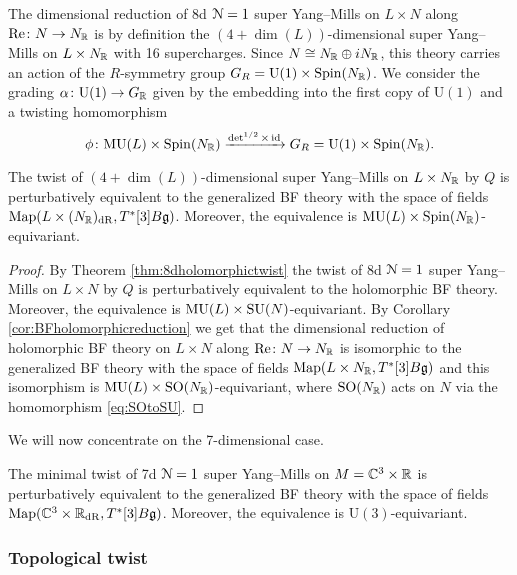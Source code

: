 \documentclass[10pt, oneside]{article}
\newcommand{\MU}{\mathrm{MU}}
\renewcommand{\Re}{\mathrm{Re}}
\renewcommand{\U}{\mathrm{U}}
\begin{document}
The dimensional reduction of 8d $\mathcal N=1$ super Yang--Mills on $L\times N$ along $\Re\colon N\rightarrow N_\RR$ is by definition the $(4+\dim(L))$-dimensional super Yang--Mills on $L\times N_\mathbb R$ with 16 supercharges. Since $N\cong N_\mathbb R\oplus iN_\mathbb R$, this theory carries an action of the $R$-symmetry group $G_R=\U(1)\times \Spin(N_\RR)$. We consider the grading $\alpha\colon \U(1)\rightarrow G_\RR$ given by the embedding into the first copy of $\U(1)$ and a twisting homomorphism
\[\phi\colon \MU(L)\times \Spin(N_\RR)\xrightarrow{\det^{1/2}\times \id} G_R=\U(1)\times \Spin(N_\RR).\]

\begin{theorem}
The twist of $(4+\dim(L))$-dimensional super Yang--Mills on $L\times N_\mathbb R$ by $Q$ is perturbatively equivalent to the generalized BF theory with the space of fields $\operatorname{Map}(L\times (N_\mathbb R)_{\mathrm{dR}}, T^*[3] B\mathfrak g)$. Moreover, the equivalence is $\MU(L)\times \Spin(N_\RR)$-equivariant.
\label{thm:8dBFreduction}
\end{theorem}
\begin{proof}
By Theorem \ref{thm:8dholomorphictwist} the twist of 8d $\mathcal N=1$ super Yang--Mills on $L\times N$ by $Q$ is perturbatively equivalent to the holomorphic BF theory. Moreover, the equivalence is $\MU(L)\times \SU(N)$-equivariant. By Corollary \ref{cor:BFholomorphicreduction} we get that the dimensional reduction of holomorphic BF theory on $L\times N$ along $\Re\colon N\rightarrow N_\RR$ is isomorphic to the generalized BF theory with the space of fields $\operatorname{Map}(L\times N_\mathbb R, T^*[3] B\mathfrak g)$ and this isomorphism is $\MU(L)\times \SO(N_\RR)$-equivariant, where $\mathrm{SO}(N_\mathbb R)$ acts on $N$ via the homomorphism \eqref{eq:SOtoSU}.
\end{proof}

We will now concentrate on the 7-dimensional case.

\begin{theorem}
The minimal twist of 7d $\mathcal N=1$ super Yang--Mills on $M=\mathbb C^3\times \mathbb R$ is perturbatively equivalent to the generalized BF theory with the space of fields $\operatorname{Map}(\mathbb C^3\times \mathbb R_{\mathrm{dR}}, T^*[3] B\mathfrak g)$. Moreover, the equivalence is $\U(3)$-equivariant.
\label{thm:7dminimaltwist}
\end{theorem}

\subsubsection{Topological twist}
\label{sect:7dtopologicaltwist}
\end{document}
